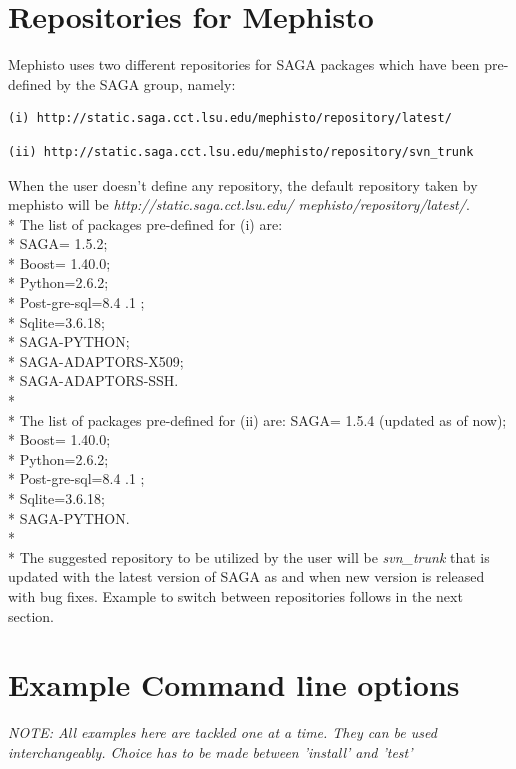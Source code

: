 \documentclass[a4paper,10pt]{article}
\begin{document}
\section*{Repositories for Mephisto} 
Mephisto uses two different repositories for SAGA packages which have been
pre-defined by the SAGA group, namely: 
\begin{verbatim}
(i) http://static.saga.cct.lsu.edu/mephisto/repository/latest/
\end{verbatim}
\begin{verbatim}
(ii) http://static.saga.cct.lsu.edu/mephisto/repository/svn_trunk
\end{verbatim}
When the user doesn't define any repository, the default 
repository taken by mephisto will be \emph {http://static.saga.cct.lsu.edu/
mephisto/repository/latest/}. \\*
The list of packages pre-defined for (i) are: \\*
SAGA= 1.5.2; \\*
Boost= 1.40.0; \\*
Python=2.6.2; \\*
Post-gre-sql=8.4 .1 ; \\*
Sqlite=3.6.18;   \\*
SAGA-PYTHON; \\*
SAGA-ADAPTORS-X509; \\*
SAGA-ADAPTORS-SSH.  \\*\\*
The list of packages pre-defined for (ii) are:
SAGA= 1.5.4 (updated as of now); \\*
Boost= 1.40.0; \\*
Python=2.6.2; \\*
Post-gre-sql=8.4 .1 ; \\*
Sqlite=3.6.18;   \\*
SAGA-PYTHON. \\*\\*
The suggested repository to be utilized by the user will be \emph{svn\_trunk} 
that is updated with the latest version of SAGA as and when
new version is released with bug fixes. Example to switch between 
repositories follows in the next section. 

\section*{Example Command line options}
\emph{NOTE: All examples here are tackled one at a time. They can be used interchangeably.
Choice has to be made between 'install' and 'test'}
\end{document}
